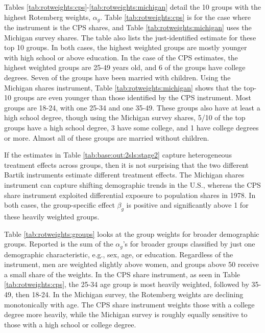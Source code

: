 \documentclass[12pt]{article}
\begin{document}
Tables \ref{tab:rotweights:cps}-\ref{tab:rotweights:michigan} detail the 10 groups with the highest Rotemberg weights, $\alpha_g$. Table \ref{tab:rotweights:cps} is for the case where the instrument is the CPS shares, and Table \ref{tab:rotweights:michigan} uses the Michigan survey shares. The table also lists the just-identified estimate for these top 10 groups. In both cases, the highest weighted groups are mostly younger with high school or above education. In the case of the CPS estimates, the highest weighted groups are 25-49 years old, and 6 of the groups have college degrees. Seven of the groups have been married with children. Using the Michigan shares instrument, Table \ref{tab:rotweights:michigan} shows that the top-10 groups are even younger than those identified by the CPS instrument. Most groups are 18-24, with one 25-34 and one 35-49. These groups also have at least a high school degree, though using the Michigan survey shares, 5/10 of the top groups have a high school degree, 3 have some college, and 1 have college degrees or more. Almost all of these groups are married without children.

If the estimates in Table \ref{tab:base:out:2sls:stage2} capture heterogeneous treatment effects across groups, then it is not surprising that the two different Bartik instruments estimate different treatment effects. The Michigan shares instrument can capture shifting demographic trends in the U.S., whereas the CPS share instrument exploited differential exposure to population shares in 1978. In both cases, the group-specific effect $\beta_g$ is positive and significantly above 1 for these heavily weighted groups.  

Table \ref{tab:rotweights:groups} looks at the group weights for broader demographic groups. Reported is the sum of the $\alpha_g$'s for broader groups classified by just one demographic characteristic, e.g., sex, age, or education. Regardless of the instrument, men are weighted slightly above women, and groups above 50 receive a small share of the weights. In the CPS share instrument, as seen in Table \ref{tab:rotweights:cps}, the 25-34 age group is most heavily weighted, followed by 35-49, then 18-24. In the Michigan survey, the Rotemberg weights are declining monotonically with age. The CPS share instrument weights those with a college degree more heavily, while the Michigan survey is roughly equally sensitive to those with a high school or college degree.
\end{document}
